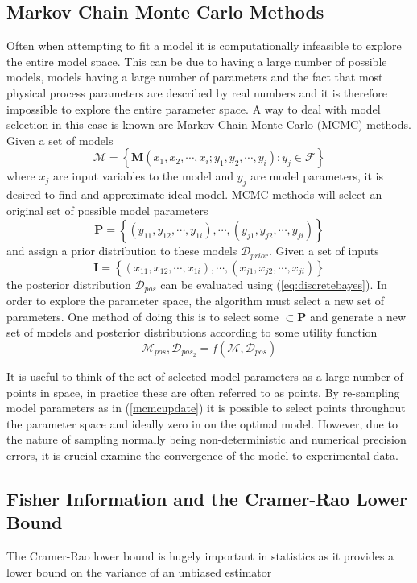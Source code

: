 \subsection{Markov Chain Monte Carlo Methods}
\label{sec:mcmcupdate}
Often when attempting to fit a model it is computationally infeasible to explore the entire model space. This can be due to having a large number of possible models, models having a large number of parameters and the fact that most physical process parameters are described by real numbers and it is therefore impossible to explore the entire parameter space. A way to deal with model selection in this case is known are Markov Chain Monte Carlo (MCMC) methods. Given a set of models 
\begin{equation}
\mathcal{M} = \left\{\mathbf{M}(x_1,x_2,\cdots,x_i;y_1,y_2,\cdots,y_i) : y_j \in \mathcal{F}\right\}
\label{eq:models}
\end{equation}
where $x_j$ are input variables to the model and $y_j$ are model parameters, it is desired to find and approximate ideal model. MCMC methods will select an original set of possible model parameters $$\mathbf{P} = \left\{(y_{11},y_{12},\cdots,y_{1i}),\cdots,(y_{j1},y_{j2},\cdots,y_{ji})\right\}$$ and assign a prior distribution to these models $\mathcal{D}_{prior}$. Given a set of inputs $$\mathbf{I} = \left\{(x_{11},x_{12},\cdots,x_{1i}),\cdots,(x_{j1},x_{j2},\cdots,x_{ji})\right\}$$ the posterior distribution $\mathcal{D}_{pos}$ can be evaluated using (\ref{eq:discretebayes}). In order to explore the parameter space, the algorithm must select a new set of parameters. One method of doing this is to select some $\subset \mathbf{P}$ and generate a new set of models and posterior distributions according to some utility function\cite{bayes}
\begin{equation}
\mathcal{M}_{pos},\mathcal{D}_{pos_2} = f(\mathcal{M},\mathcal{D}_{pos})
\label{mcmcupdate} 
\end{equation}

It is useful to think of the set of selected model parameters as a large number of points in space, in practice these are often referred to as points. By re-sampling model parameters as in (\ref{mcmcupdate}) it is possible to select points throughout the parameter space and ideally zero in on the optimal model. However, due to the nature of sampling normally being non-deterministic and numerical precision errors, it is crucial examine the convergence of the model to experimental data. 

\subsection{Fisher Information and the Cramer-Rao Lower Bound}
The Cramer-Rao lower bound is hugely important in statistics as it provides a lower bound on the variance of an unbiased estimator 
